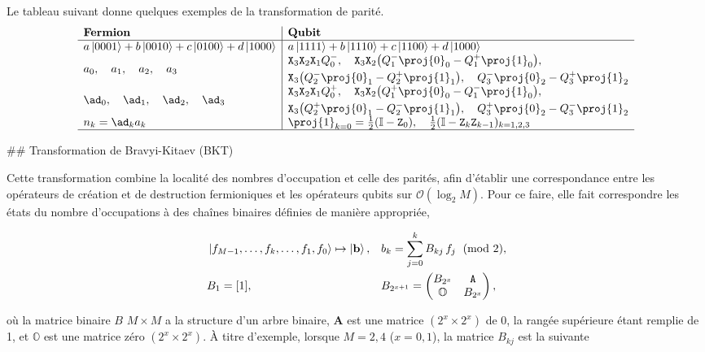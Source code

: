 \documentclass[12pt,a4paper]{article} %
\numberwithin{equation}{section} %
\numberwithin{figure}{section} %
\numberwithin{table}{section} %
\begin{document}
Le tableau suivant donne quelques exemples de la transformation de parité.
$$
\begin{array}{l|l}
\textbf{Fermion} & \textbf{Qubit} \\ \hline
a\ket{0001}+b\ket{0010}+c\ket{0100}+d\ket{1000} & a\ket{1111}+b\ket{1110}+c\ket{1100}+d\ket{1000}  \\
a_0 ,\quad a_1 ,\quad a_2 ,\quad a_3 &
\begin{split}
&\mathtt{X}_3\mathtt{X}_2\mathtt{X}_1Q^-_0 ,\quad \mathtt{X}_3\mathtt{X}_2\big( Q^-_1\proj{0}_0 - Q^+_1\proj{1}_0 \big) ,\\ &\mathtt{X}_3\big( Q^-_2\proj{0}_1 - Q^+_2\proj{1}_1 \big) ,\quad Q^-_3\proj{0}_2 - Q^+_3\proj{1}_2
\end{split} \\
\ad_0 ,\quad \ad_1 ,\quad \ad_2 ,\quad \ad_3 &
\begin{split}
& \mathtt{X}_3\mathtt{X}_2\mathtt{X}_1Q^+_0 ,\quad \mathtt{X}_3\mathtt{X}_2\big( Q^+_1\proj{0}_0 - Q^-_1\proj{1}_0 \big) ,\\ &\mathtt{X}_3\big( Q^+_2\proj{0}_1 - Q^-_2\proj{1}_1 \big) ,\quad Q^+_3\proj{0}_2 - Q^-_3\proj{1}_2 
\end{split}\\
n_k = \ad_k a_k & \proj{1}_{k=0}=\frac12(\mathbb{I} - \mathtt{Z}_0) ,\quad  \frac12(\mathbb{I} - \mathtt{Z}_k\mathtt{Z}_{k-1})_{k=1,2,3}\\\hline
\end{array}
$$

## Transformation de Bravyi-Kitaev (BKT)

Cette transformation combine la localité des nombres d'occupation et celle des parités, afin d'établir une correspondance entre les opérateurs de création et de destruction fermioniques et les opérateurs qubits sur $\mathcal{O}(\log_2M)$. Pour ce faire, elle fait correspondre les états du nombre d'occupations à des chaînes binaires définies de manière appropriée,

\begin{align*}
    &\ket{f_{M-1},\dots,f_k,\dots, f_1,f_0}\mapsto \ket{\mathbf{b}} , &&b_k = \sum_{j=0}^k B_{kj} \, f_j \, \pmod 2,\\
    &B_1 = [1], &&B_{2^{x+1}}= \begin{pmatrix} B_{2^x} & \mathtt{A}\\ \mathbb{O} & B_{2^x}\end{pmatrix} ,
\end{align*}

où la matrice binaire $B$ $M \times M$ a la structure d'un arbre binaire, $\mathbf{A}$ est une matrice $(2^x \times 2^x)$ de 0, la rangée supérieure étant remplie de 1, et $\mathbb{O}$ est une matrice zéro $(2^x \times 2^x)$. À titre d'exemple, lorsque $M = 2,4$ ($x=0,1$), la matrice $B_{kj}$ est la suivante
\end{document}
